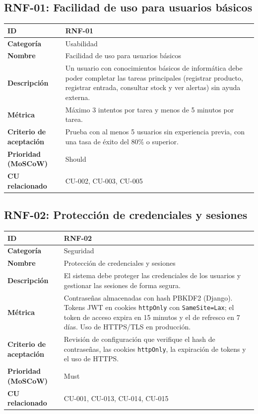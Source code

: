 \documentclass[12pt, a4paper]{article}
\begin{document}
\subsection{RNF-01: Facilidad de uso para usuarios básicos}
\begin{center}
\renewcommand{\arraystretch}{1.4}
\begin{tabular}{|L{4cm}|L{12cm}|}
\hline
\textbf{ID} & RNF-01 \\
\hline
\textbf{Categoría} & Usabilidad \\
\hline
\textbf{Nombre} & Facilidad de uso para usuarios básicos \\
\hline
\textbf{Descripción} & Un usuario con conocimientos básicos de informática debe poder completar las tareas principales (registrar producto, registrar entrada, consultar stock y ver alertas) sin ayuda externa. \\
\hline
\textbf{Métrica} & Máximo 3 intentos por tarea y menos de 5 minutos por tarea. \\
\hline
\textbf{Criterio de aceptación} & Prueba con al menos 5 usuarios sin experiencia previa, con una tasa de éxito del 80\% o superior. \\
\hline
\textbf{Prioridad (MoSCoW)} & Should \\
\hline
\textbf{CU relacionado} & CU-002, CU-003, CU-005 \\
\hline
\end{tabular}
\end{center}

\subsection{RNF-02: Protección de credenciales y sesiones}
\begin{center}
\renewcommand{\arraystretch}{1.4}
\begin{tabular}{|L{4cm}|L{12cm}|}
\hline
\textbf{ID} & RNF-02 \\
\hline
\textbf{Categoría} & Seguridad \\
\hline
\textbf{Nombre} & Protección de credenciales y sesiones \\
\hline
\textbf{Descripción} & El sistema debe proteger las credenciales de los usuarios y gestionar las sesiones de forma segura. \\
\hline
\textbf{Métrica} & Contraseñas almacenadas con hash PBKDF2 (Django). Tokens JWT en cookies \texttt{httpOnly} con \texttt{SameSite=Lax}; el token de acceso expira en 15 minutos y el de refresco en 7 días. Uso de HTTPS/TLS en producción. \\
\hline
\textbf{Criterio de aceptación} & Revisión de configuración que verifique el hash de contraseñas, las cookies \texttt{httpOnly}, la expiración de tokens y el uso de HTTPS. \\
\hline
\textbf{Prioridad (MoSCoW)} & Must \\
\hline
\textbf{CU relacionado} & CU-001, CU-013, CU-014, CU-015 \\
\hline
\end{tabular}
\end{center}
\end{document}
